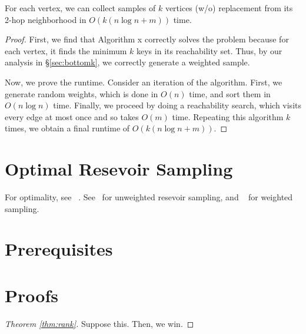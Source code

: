 \documentclass{article}
\begin{document}
\begin{theorem}
	For each vertex, we can collect samples of $k$ vertices (w/o) replacement from its 2-hop neighborhood in $O(k(n \log n + m))$ time.
\end{theorem}

\begin{proof}
	First, we find that Algorithm x correctly solves the problem because for each vertex, it finds the minimum $k$ keys in its reachability set.
	Thus, by our analysis in \S\ref{sec:bottomk}, we correctly generate a weighted sample.

	Now, we prove the runtime.
	Consider an iteration of the algorithm.
	First, we generate random weights, which is done in $O(n)$ time, and sort them in $O(n \log n)$ time.
	Finally, we proceed by doing a reachability search, which visits every edge at most once and so takes $O(m)$ time.
	Repeating this algorithm $k$ times, we obtain a final runtime of $O(k(n \log n + m))$.
\end{proof}

\section{Optimal Resevoir Sampling}
\label{sec:resevoir}

For optimality, see ~\cite{vitter85-03}.
See~\cite{li94-12} for unweighted resevoir sampling, and ~\cite{efraimidis06-03} for weighted sampling.

\section{Prerequisites}
\label{sec:prereq}

\section{Proofs}
\label{sec:proofs}

\begin{proof}[Theorem \ref{thm:rank}]
	Suppose this.
	Then, we win.
\end{proof}

\printbibliography
\end{document}
